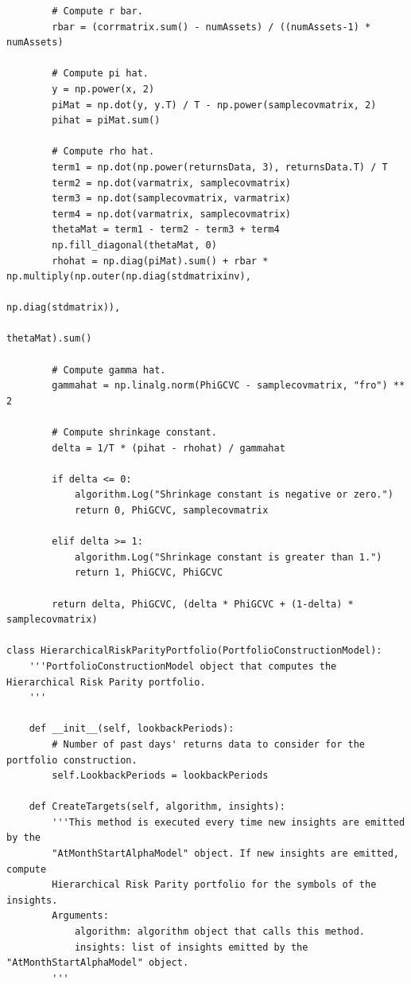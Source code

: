 \begin{verbatim}
        # Compute r bar.
        rbar = (corrmatrix.sum() - numAssets) / ((numAssets-1) * numAssets)
    
        # Compute pi hat.
        y = np.power(x, 2)
        piMat = np.dot(y, y.T) / T - np.power(samplecovmatrix, 2)
        pihat = piMat.sum()
    
        # Compute rho hat.
        term1 = np.dot(np.power(returnsData, 3), returnsData.T) / T
        term2 = np.dot(varmatrix, samplecovmatrix)
        term3 = np.dot(samplecovmatrix, varmatrix)
        term4 = np.dot(varmatrix, samplecovmatrix)
        thetaMat = term1 - term2 - term3 + term4
        np.fill_diagonal(thetaMat, 0)
        rhohat = np.diag(piMat).sum() + rbar * np.multiply(np.outer(np.diag(stdmatrixinv),
                                                                    np.diag(stdmatrix)),
                                                           thetaMat).sum()
    
        # Compute gamma hat.
        gammahat = np.linalg.norm(PhiGCVC - samplecovmatrix, "fro") ** 2
    
        # Compute shrinkage constant.
        delta = 1/T * (pihat - rhohat) / gammahat
    
        if delta <= 0:
            algorithm.Log("Shrinkage constant is negative or zero.")
            return 0, PhiGCVC, samplecovmatrix
    
        elif delta >= 1:
            algorithm.Log("Shrinkage constant is greater than 1.")
            return 1, PhiGCVC, PhiGCVC
    
        return delta, PhiGCVC, (delta * PhiGCVC + (1-delta) * samplecovmatrix)
        
class HierarchicalRiskParityPortfolio(PortfolioConstructionModel):
    '''PortfolioConstructionModel object that computes the Hierarchical Risk Parity portfolio.
    '''
    
    def __init__(self, lookbackPeriods):
        # Number of past days' returns data to consider for the portfolio construction.
        self.LookbackPeriods = lookbackPeriods
        
    def CreateTargets(self, algorithm, insights):
        '''This method is executed every time new insights are emitted by the
        "AtMonthStartAlphaModel" object. If new insights are emitted, compute
        Hierarchical Risk Parity portfolio for the symbols of the insights.
        Arguments:
            algorithm: algorithm object that calls this method.
            insights: list of insights emitted by the "AtMonthStartAlphaModel" object.
        '''
        

\end{verbatim}
